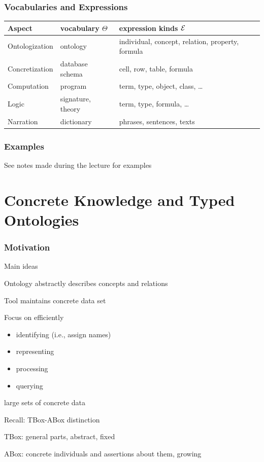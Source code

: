 \documentclass{beamer}
\begin{document}
\begin{frame}\frametitle{Vocabularies and Expressions}
\begin{center}
\footnotesize
\begin{tabular}{l|ll}
Aspect & vocabulary $\Theta$ & expression kinds $\mathcal{E}$ \\
\hline
Ontologization  & ontology & individual, concept, relation, property, formula \\
Concretization & database schema & cell, row, table, formula \\
Computation & program & term, type, object, class, \ldots \\
Logic & signature, theory & term, type, formula, \ldots \\
Narration & dictionary & phrases, sentences, texts \\
\end{tabular}
\end{center}
\end{frame}

\begin{frame}\frametitle{Examples}
See notes made during the lecture for examples
\end{frame}

\section{Concrete Knowledge and Typed Ontologies}

\begin{frame}\frametitle{Motivation}
\begin{blockitems}{Main ideas}
\item Ontology abstractly describes concepts and relations
\item Tool maintains concrete data set
\item Focus on efficiently
  \begin{itemize}
  \item identifying (i.e., assign names)
  \item representing
  \item processing
  \item querying
  \end{itemize}
  large sets of concrete data
\end{blockitems}

\begin{blockitems}{Recall: TBox-ABox distinction}
  \item TBox: general parts, abstract, fixed
  \item ABox: concrete individuals and assertions about them, growing
\end{blockitems}
\end{frame}
\end{document}
